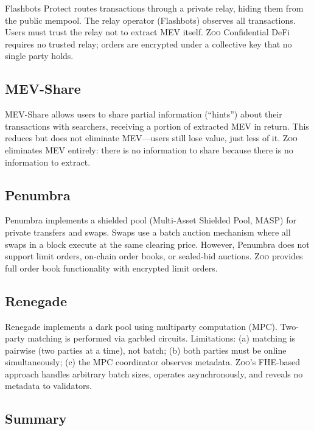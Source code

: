\documentclass[11pt,letterpaper]{article}
\theoremstyle{definition}
\theoremstyle{remark}
\newcommand{\Zoo}{\textsc{Zoo}}
\newcommand{\FHE}{\textsc{FHE}}
\newcommand{\MEV}{\textsc{MEV}}
\begin{document}
Flashbots Protect routes transactions through a private relay, hiding them from the public mempool. The relay operator (Flashbots) observes all transactions. Users must trust the relay not to extract \MEV{} itself. \Zoo{} Confidential DeFi requires no trusted relay; orders are encrypted under a collective key that no single party holds.

\subsection{MEV-Share}

MEV-Share allows users to share partial information (``hints'') about their transactions with searchers, receiving a portion of extracted \MEV{} in return. This reduces but does not eliminate \MEV{}---users still lose value, just less of it. \Zoo{} eliminates \MEV{} entirely: there is no information to share because there is no information to extract.

\subsection{Penumbra}

Penumbra implements a shielded pool (Multi-Asset Shielded Pool, MASP) for private transfers and swaps. Swaps use a batch auction mechanism where all swaps in a block execute at the same clearing price. However, Penumbra does not support limit orders, on-chain order books, or sealed-bid auctions. \Zoo{} provides full order book functionality with encrypted limit orders.

\subsection{Renegade}

Renegade implements a dark pool using multiparty computation (MPC). Two-party matching is performed via garbled circuits. Limitations: (a) matching is pairwise (two parties at a time), not batch; (b) both parties must be online simultaneously; (c) the MPC coordinator observes metadata. \Zoo{}'s \FHE{}-based approach handles arbitrary batch sizes, operates asynchronously, and reveals no metadata to validators.

\subsection{Summary}
\end{document}
